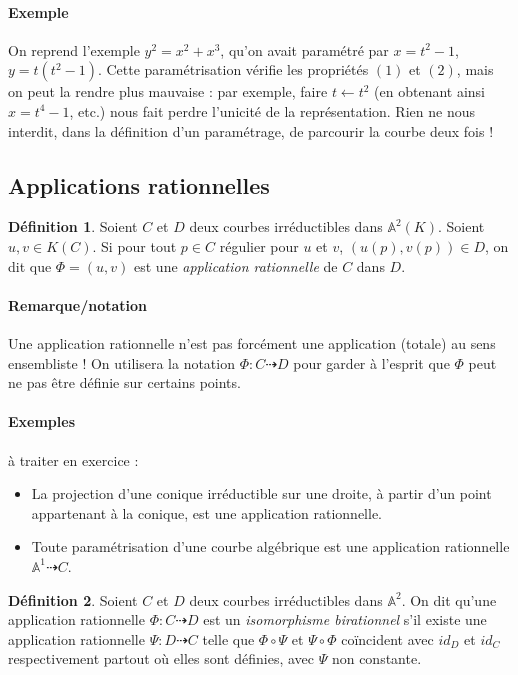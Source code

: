 \documentclass[a4paper, 11pt]{article}
\theoremstyle{definition}
\newtheorem{définition}{Définition}
\newcommand{\aff}{\mathbb{A}}
\begin{document}
\paragraph{Exemple} On reprend l'exemple $y^2 = x^2 + x^3$, qu'on
avait paramétré par $x = t^2 - 1$, $y = t(t^2 - 1)$. Cette
paramétrisation vérifie les propriétés $(1)$ et $(2)$, mais on peut la
rendre plus mauvaise : par exemple, faire $t \leftarrow t^2$ (en
obtenant ainsi $x = t^4 - 1$, etc.) nous fait perdre l'unicité de la
représentation. Rien ne nous interdit, dans la définition d'un
paramétrage, de parcourir la courbe deux fois !

\subsection{Applications rationnelles}

\begin{définition}
  Soient $C$ et $D$ deux courbes irréductibles dans
  $\aff^2(K)$. Soient $u, v \in K(C)$. Si pour tout $p \in C$ régulier
  pour $u$ et $v$, $(u(p), v(p)) \in D$, on dit que $\Phi = (u,v)$ est
  une \emph{application rationnelle} de $C$ dans $D$.
\end{définition}
\paragraph{Remarque/notation} Une application rationnelle n'est pas
forcément une application (totale) au sens ensembliste ! On utilisera
la notation $\Phi : C \dashrightarrow D$ pour garder à l'esprit que
$\Phi$ peut ne pas être définie sur certains points.

\paragraph{Exemples} à traiter en exercice :
\begin{itemize}
\item La projection d'une conique irréductible sur une droite, à
  partir d'un point appartenant à la conique, est une application
  rationnelle.
\item Toute paramétrisation d'une courbe algébrique est une
  application rationnelle $\aff^1 \dashrightarrow C$.
\end{itemize}

\begin{définition}
  Soient $C$ et $D$ deux courbes irréductibles dans $\aff^2$. On dit
  qu'une application rationnelle $\Phi : C \dashrightarrow D$ est un
  \emph{isomorphisme birationnel} s'il existe une application
  rationnelle $\Psi : D \dashrightarrow C$ telle que $\Phi \circ \Psi$
  et $\Psi \circ \Phi$ coïncident avec $id_D$ et $id_C$ respectivement
  partout où elles sont définies, avec $\Psi$ non constante.
\end{définition}
\end{document}
